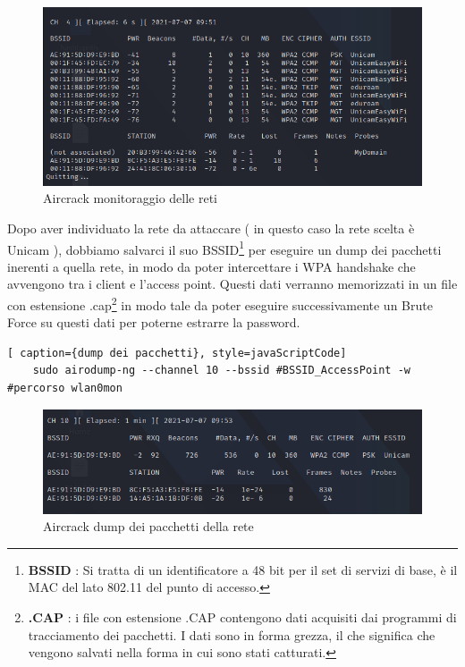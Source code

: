 \begin{figure}[ht]
    \centering
    \includegraphics[width=\linewidth]{Immagini/6/aircrack_3.png}
    \caption{Aircrack monitoraggio delle reti }
    \label{fig:Aircrack example}
\end{figure}

\newpage

Dopo aver individuato la rete da attaccare ( in questo caso la rete scelta è Unicam ), dobbiamo salvarci il suo BSSID\footnote[1]{\textbf{BSSID} : Si tratta di un identificatore a 48 bit per il set di servizi di base, è il MAC del lato 802.11 del punto di accesso.} per eseguire un dump dei pacchetti inerenti a quella rete, in modo da poter intercettare i WPA handshake che avvengono tra i client e l'access point. Questi dati verranno memorizzati in un file con estensione .cap\footnote[1]{\textbf{.CAP} : i file con estensione .CAP contengono dati acquisiti dai programmi di tracciamento dei pacchetti. I dati sono in forma grezza, il che significa che vengono salvati nella forma in cui sono stati catturati.} in modo tale da poter eseguire successivamente un Brute Force su questi dati per poterne estrarre la password.

\begin{lstlisting}[ caption={dump dei pacchetti}, style=javaScriptCode]
	sudo airodump-ng --channel 10 --bssid #BSSID_AccessPoint -w #percorso wlan0mon
\end{lstlisting}

\begin{figure}[ht]
    \centering
    \includegraphics[width=\linewidth]{Immagini/6/aircrack_4.png}
    \caption{Aircrack dump dei pacchetti della rete}
    \label{fig:Aircrack example}
\end{figure}

